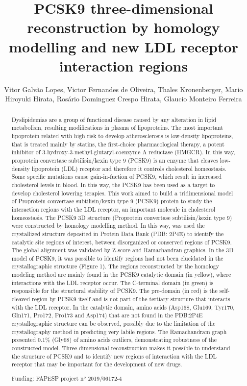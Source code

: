 \documentclass[twoside]{article}
\title{\vspace{-15mm}\fontsize{24pt}{10pt}\selectfont\textbf{ PCSK9 three-dimensional reconstruction by homology modelling and new LDL receptor interaction regions }} %
\author{ Vitor Galv\~ao Lopes, Victor Fernandes de Oliveira, Thales Kronenberger, Mario Hiroyuki Hirata, Ros\'ario Dominguez Crespo Hirata, Glaucio Monteiro Ferreira }
\affil{ Laboratory of Molecular Biology applied to Diagnostic (LBMAD),  Department of Pharmacy,  Faculty of Pharmaceutical Sciences,  University of S\~ao Paulo,  S\~ao Paulo,  SP,  Brazil. }
\date{}
\begin{document}
  
  
  \maketitle %
  
  
  \thispagestyle{fancy} %
  
  
  \begin{abstract}
  Dyslipidemias are a group of functional disease caused by any alteration in lipid metabolism,  resulting modifications in plasma of lipoproteins. The most important lipoprotein related with high risk to develop atherosclerosis is low-density lipoproteins,  that is treated mainly by statins,  the first-choice pharmacological therapy,  a potent inhibitor of 3-hydroxy-3-methyl-glutaryl-coenzyme A reductase (HMGCR). In this way,  proprotein convertase subtilisin/kexin type 9 (PCSK9) is an enzyme that cleaves low-density lipoprotein (LDL) receptor and therefore it controls cholesterol homeostasis. Some specific mutations cause gain-in-fuction of PCSK9,  which result in increased cholesterol levels in blood. In this way,  the PCSK9 has been used as a target to develop cholesterol lowering terapies. This work aimed to build a tridimensional model of Proprotein convertase subtilisin/kexin type 9 (PCSK9) protein to study the interaction regions with the LDL receptor,  an important molecule in cholesterol homeostasis. The PCSK9 3D structure (Proprotein convertase subtilisin/kexin type 9) were constructed by homology modelling method. In this way,  was used the crystallized structure deposited in Protein Data Bank (PDB: 2P4E) to identify the catalytic site regions of interest,  between disorganized or conserved regions of PCSK9. The global alignment was validated by Z-score and Ramachandran graphics. In the 3D model of PCSK9,  it was possible to identify regions had not been elucidated in the crystallographic structure (Figure 1). The regions reconstructed by the homology modeling method are mainly found in the PCSK9 catalytic domain (in yellow),  where interactions with the LDL receptor occur. The C-terminal domain (in green) is responsible for the structural stability of PCSK9. The pre-domain (in red) is the self-cleaved region by PCSK9 itself and is not part of the tertiary structure that interacts with the LDL receptor. In the catalytic domain,  amino acids (Asp168,  Glu169,  Tyr170,  Gln171,  Pro172,  Pro173 and Asp174) that are not found in the PDB:2P4E crystallographic structure can be observed,  possibly due to the limitation of the crystallography method in predicting very labile regions. The Ramachandram graph presented 0.1\% (Gly68) of amino acids outliers,  demonstrating robustness of the constructed model. Three-dimensional reconstruction makes it possible to understand the structure of PCSK9 and to identify new regions of interaction with the LDL receptor that may be important for the development of new drugs.
  
  Funding: FAPESP project n$^o$ 2019/06172-4 \\ 
  \end{abstract}
  
\end{document}
